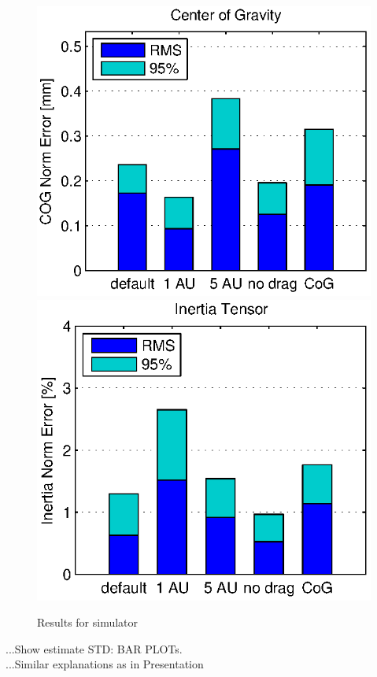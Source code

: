 \begin{figure}[hbtp]
\includegraphics[scale=.72]{images/results/err_cmp_sim_cog.eps}
\includegraphics[scale=.72]{images/results/err_cmp_sim_tensor.eps}
\caption{Results for simulator}
\label{fig:err_cmp_sim}
\end{figure}



...Show estimate STD: BAR PLOTs.\\
...Similar explanations as in Presentation

